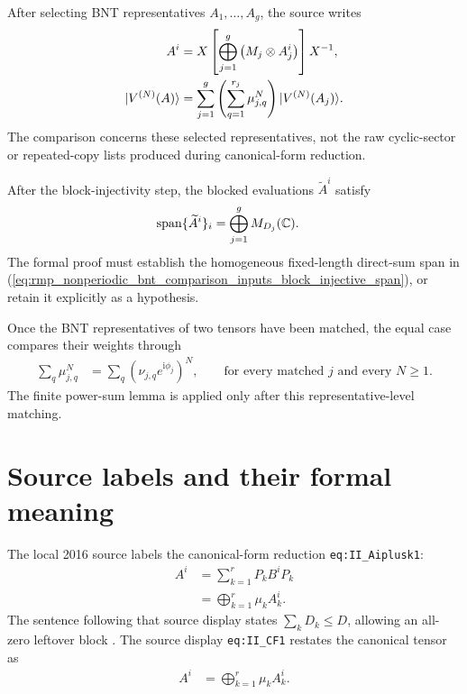 \documentclass{article}
\begin{document}
After selecting BNT representatives $A_1,\ldots,A_g$, the source writes
\begin{align}
    A^i
        &=
        X\left[\bigoplus_{j=1}^{g}\left(M_j\otimes A_j^i\right)\right]X^{-1},
    \label{eq:rmp_nonperiodic_bnt_comparison_inputs_bnt_tensor_decomposition}\\
    |V^{(N)}(A)\rangle
        &=
        \sum_{j=1}^{g}
        \left(\sum_{q=1}^{r_j}\mu_{j,q}^{N}\right)
        |V^{(N)}(A_j)\rangle.
    \label{eq:rmp_nonperiodic_bnt_comparison_inputs_bnt_mpv_decomposition}
\end{align}
The comparison concerns these selected representatives, not the raw
cyclic-sector or repeated-copy lists produced during canonical-form reduction.

After the block-injectivity step, the blocked evaluations $\widetilde A^i$
satisfy
\begin{align}
    \operatorname{span}\{\widetilde A^i\}_i
        &=
        \bigoplus_{j=1}^{g} M_{D_j}(\mathbb{C}).
    \label{eq:rmp_nonperiodic_bnt_comparison_inputs_block_injective_span}
\end{align}
The formal proof must establish the homogeneous fixed-length direct-sum span in
(\ref{eq:rmp_nonperiodic_bnt_comparison_inputs_block_injective_span}), or retain
it explicitly as a hypothesis.

Once the BNT representatives of two tensors have been matched, the equal case
compares their weights through
\begin{align}
    \sum_q \mu_{j,q}^{N}
        &=
        \sum_q \left(\nu_{j,q}e^{\mathrm{i}\phi_j}\right)^{N},
        \qquad\text{for every matched $j$ and every $N\geq 1$}.
    \label{eq:rmp_nonperiodic_bnt_comparison_inputs_equal_case_power_sums}
\end{align}
The finite power-sum lemma is applied only after this representative-level
matching.

\section{Source labels and their formal meaning}

The local 2016 source labels the canonical-form reduction
\texttt{eq:II\_Aiplusk1}:
\begin{align}
    A^i
        &=
        \sum_{k=1}^{r}P_k B^iP_k
    \label{eq:rmp_nonperiodic_bnt_comparison_inputs_source_invariant_reduction}\\
        &=
        \bigoplus_{k=1}^{r}\mu_k A_k^i.
    \label{eq:rmp_nonperiodic_bnt_comparison_inputs_source_canonical_reduction}
\end{align}
The sentence following that source display states
$\sum_k D_k\leq D$, allowing an all-zero leftover block
\cite[lines~214--219]{Cirac2016MPDO_arXiv}. The source display
\texttt{eq:II\_CF1} restates the canonical tensor as
\begin{align}
    A^i
        &=
        \bigoplus_{k=1}^{r}\mu_k A_k^i.
    \label{eq:rmp_nonperiodic_bnt_comparison_inputs_source_canonical_form}
\end{align}
\end{document}
